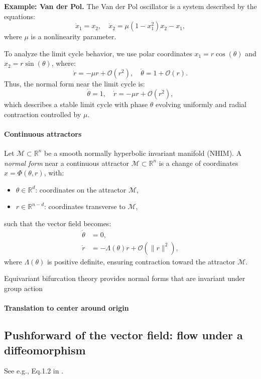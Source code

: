 \documentclass{article}
\theoremstyle{definition} \newtheorem{definition}{Definition}  \newtheorem{example}{Example}
\theoremstyle{remark} \newtheorem{remark}{Remark}
\newcommand{\reals}{\mathbb{R}}
\newcommand{\manifold}{\mathcal{M}}
\newcounter{ct}
\begin{document}
\textbf{Example: Van der Pol.} 
The Van der Pol oscillator is a system described by the equations:
\[
\dot{x}_1 = x_2, \quad \dot{x}_2 = \mu (1 - x_1^2) x_2 - x_1,
\]
where \( \mu \) is a nonlinearity parameter.

To analyze the limit cycle behavior, we use polar coordinates \( x_1 = r \cos(\theta) \) and \( x_2 = r \sin(\theta) \), where:
\[
\dot{r} = -\mu r + \mathcal{O}(r^2), \quad \dot{\theta} = 1 + \mathcal{O}(r).
\]
Thus, the normal form near the limit cycle is:
\[
\dot{\theta} = 1, \quad \dot{r} = -\mu r + \mathcal{O}(r^2),
\]
which describes a stable limit cycle with phase \( \theta \) evolving uniformly and radial contraction controlled by \( \mu \).


\paragraph{Continuous attractors}%
Let $\manifold\subset\reals^n$  be a smooth normally hyperbolic invariant manifold (NHIM).
A \emph{normal form} near a continuous attractor \(\manifold \subset \mathbb{R}^n \) is a change of coordinates 
\( x = \Phi(\theta, r) \), with:
\begin{itemize}
  \item \( \theta \in \mathbb{R}^d \): coordinates on the attractor \( \manifold\),
  \item \( r \in \mathbb{R}^{n-d} \): coordinates transverse to \(\manifold \),
\end{itemize}
such that the vector field becomes:
\[
\begin{aligned}
\dot{\theta} &= 0, \\
\dot{r} &= -\Lambda(\theta) r + \mathcal{O}(\|r\|^2),
\end{aligned}
\]
where \( \Lambda(\theta) \) is positive definite, ensuring contraction toward the attractor \(\manifold\).

Equivariant bifurcation theory provides normal forms that are invariant under group action


\paragraph{Translation to center around origin}




\subsection{Pushforward of the vector field: flow under a diffeomorphism}
See e.g., Eq.1.2 in \citep{agrachev2013control}.
\end{document}
